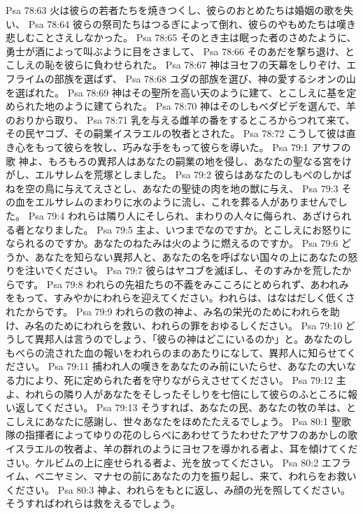Psa 78:63  火は彼らの若者たちを焼きつくし、彼らのおとめたちは婚姻の歌を失い、
Psa 78:64  彼らの祭司たちはつるぎによって倒れ、彼らのやもめたちは嘆き悲しむことさえしなかった。
Psa 78:65  そのとき主は眠った者のさめたように、勇士が酒によって叫ぶように目をさまして、
Psa 78:66  そのあだを撃ち退け、とこしえの恥を彼らに負わせられた。
Psa 78:67  神はヨセフの天幕をしりぞけ、エフライムの部族を選ばず、
Psa 78:68  ユダの部族を選び、神の愛するシオンの山を選ばれた。
Psa 78:69  神はその聖所を高い天のように建て、とこしえに基を定められた地のように建てられた。
Psa 78:70  神はそのしもべダビデを選んで、羊のおりから取り、
Psa 78:71  乳を与える雌羊の番をするところからつれて来て、その民ヤコブ、その嗣業イスラエルの牧者とされた。
Psa 78:72  こうして彼は直き心をもって彼らを牧し、巧みな手をもって彼らを導いた。
Psa 79:1  アサフの歌 神よ、もろもろの異邦人はあなたの嗣業の地を侵し、あなたの聖なる宮をけがし、エルサレムを荒塚としました。
Psa 79:2  彼らはあなたのしもべのしかばねを空の鳥に与えてえさとし、あなたの聖徒の肉を地の獣に与え、
Psa 79:3  その血をエルサレムのまわりに水のように流し、これを葬る人がありませんでした。
Psa 79:4  われらは隣り人にそしられ、まわりの人々に侮られ、あざけられる者となりました。
Psa 79:5  主よ、いつまでなのですか。とこしえにお怒りになられるのですか。あなたのねたみは火のように燃えるのですか。
Psa 79:6  どうか、あなたを知らない異邦人と、あなたの名を呼ばない国々の上にあなたの怒りを注いでください。
Psa 79:7  彼らはヤコブを滅ぼし、そのすみかを荒したからです。
Psa 79:8  われらの先祖たちの不義をみこころにとめられず、あわれみをもって、すみやかにわれらを迎えてください。われらは、はなはだしく低くされたからです。
Psa 79:9  われらの救の神よ、み名の栄光のためにわれらを助け、み名のためにわれらを救い、われらの罪をおゆるしください。
Psa 79:10  どうして異邦人は言うのでしょう、「彼らの神はどこにいるのか」と。あなたのしもべらの流された血の報いをわれらのまのあたりになして、異邦人に知らせてください。
Psa 79:11  捕われ人の嘆きをあなたのみ前にいたらせ、あなたの大いなる力により、死に定められた者を守りながらえさせてください。
Psa 79:12  主よ、われらの隣り人があなたをそしったそしりを七倍にして彼らのふところに報い返してください。
Psa 79:13  そうすれば、あなたの民、あなたの牧の羊は、とこしえにあなたに感謝し、世々あなたをほめたたえるでしょう。
Psa 80:1  聖歌隊の指揮者によってゆりの花のしらべにあわせてうたわせたアサフのあかしの歌 イスラエルの牧者よ、羊の群れのようにヨセフを導かれる者よ、耳を傾けてください。ケルビムの上に座せられる者よ、光を放ってください。
Psa 80:2  エフライム、ベニヤミン、マナセの前にあなたの力を振り起し、来て、われらをお救いください。
Psa 80:3  神よ、われらをもとに返し、み顔の光を照してください。そうすればわれらは救をえるでしょう。
